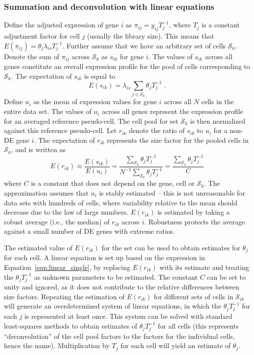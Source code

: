 \documentclass{bmcart}
\begin{document}
\subsubsection*{Summation and deconvolution with linear equations}
Define the adjusted expression of gene $i$ as $\pi_{ij} = y_{ij}T_j^{-1}$, where $T_j$ is a constant adjustment factor for cell $j$ (usually the library size).
This means that $E(\pi_{ij}) =\theta_j\lambda_{is} T_j^{-1}$.
Further assume that we have an arbitrary set of cells $\mathcal{S}_k$.
Denote the sum of $\pi_{ij}$ across $\mathcal{S}_k$ as $s_{ik}$ for gene $i$.
The values of $s_{ik}$ across all genes constitute an overall expression profile for the pool of cells corresponding to $\mathcal{S}_k$.
The expectation of $s_{ik}$ is equal to 
\[
    E(s_{ik}) = \lambda_{is} \sum_{j \in \mathcal{S}_k} \theta_j T_j^{-1}\;.
\]
Define $u_{i}$ as the mean of expression values for gene $i$ across all $N$ cells in the entire data set.
The values of $u_{i}$ across all genes represent the expression profile for an averaged reference pseudo-cell.
The cell pool for set $\mathcal{S}_k$ is then normalized against this reference pseudo-cell.
Let $r_{ik}$ denote the ratio of $s_{ik}$ to $u_{i}$ for a non-DE gene $i$.
The expectation of $r_{ik}$ represents the size factor for the pooled cells in $\mathcal{S}_k$, and is written as
\begin{equation}
    E(r_{ik}) \approx \frac{E(s_{ik})}{E(u_{i})} 
    = \frac{\sum_{\mathcal{S}_k} \theta_j T_j^{-1}}{ N^{-1} \sum_{\mathcal{S}_0} \theta_j T_j^{-1}} 
    = \frac{\sum_{\mathcal{S}_k} \theta_j T_j^{-1}}{C}
    \label{eqn:linear_single}
\end{equation}
where $C$ is a constant that does not depend on the gene, cell or $\mathcal{S}_k$.
The approximation assumes that $u_{i}$ is stably estimated 
    -- this is not unreasonable for data sets with hundreds of cells, where variability relative to the mean should decrease due to the law of large numbers.
$E(r_{ik})$ is estimated by taking a robust average (i.e., the median) of $r_{ik}$ across $i$.
Robustness protects the average against a small number of DE genes with extreme ratios.

The estimated value of $E(r_{ik})$ for the set can be used to obtain estimates for $\theta_j$ for each cell.
A linear equation is set up based on the expression in Equation~\ref{eqn:linear_single}, 
by replacing $E(r_{ik})$ with its estimate and treating the $\theta_j T_j^{-1}$ as unknown parameters to be estimated.
The constant $C$ can be set to unity and ignored, as it does not contribute to the relative differences between size factors.
Repeating the estimation of $E(r_{ik})$ for different sets of cells in $\mathcal{S}_{ik}$ will generate an overdetermined system of linear equations, 
    in which the $\theta_j T_j^{-1}$ for each $j$ is represented at least once.
This system can be solved with standard least-squares methods to obtain estimates of $\theta_j T_j^{-1}$ for all cells 
    (this represents ``deconvolution'' of the cell pool factors to the factors for the individual cells, hence the name).
Multiplication by $T_j$ for each cell will yield an estimate of $\theta_j$.
\end{document}
